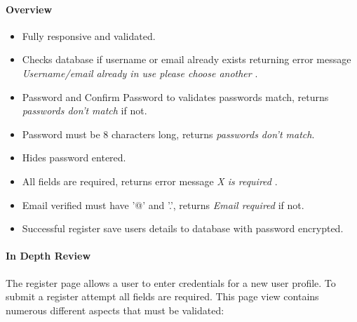 \paragraph{Overview\newline}
\begin{itemize}
    \item Fully responsive and validated.
    \item Checks database if username or email already exists returning error message  {\color{red}\textit{Username/email already in use please choose another }}.
    \item Password and Confirm Password to validates passwords match, returns  {\color{red}\textit{passwords don't match}} if not.
    \item Password must be 8 characters long, returns {\color{red}\textit{passwords don't match}}.
    \item Hides password entered.
    \item All fields are required, returns error message {\color{red} \textit{X is required}} .
    \item Email verified must have '@' and '.', returns  {\color{red}\textit{Email required}} if not.
    \item Successful register save users details to database with password encrypted.
\end{itemize}

\paragraph{In Depth Review\newline}
The register page allows a user to enter credentials for a new user profile. To submit a register attempt all fields are required. This page view contains numerous different aspects that must be validated:


